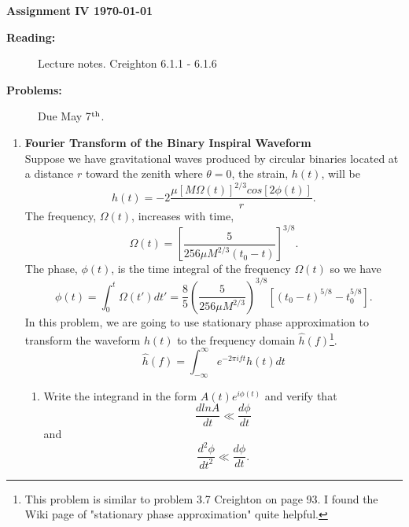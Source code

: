 \documentclass[12pt,twoside]{article}
\begin{document}
%
\centerline{\large\bf  \hfill Assignment IV \hfill  \today}

\medskip
\begin{description}
\item[{\bf Reading:}] Lecture notes. Creighton 6.1.1 - 6.1.6\\
\item[{\bf Problems:} \hfill ] Due May 7$^{\rm th}$.
\end{description}


\medskip

\begin{enumerate}
\item {\bf Fourier Transform of the Binary Inspiral Waveform}\\
Suppose we have gravitational waves produced by circular binaries located at a distance $r$ toward the zenith where $\theta=0$, the strain, $h(t)$, will be
\begin{equation}
    h(t)=-2\frac{\mu \left[M\Omega(t)\right]^{2/3}cos[2\phi(t)]}{r}.
\end{equation}
The frequency, $\Omega(t)$, increases with time,
\begin{equation}
    \Omega(t)=\left[\frac{5}{256\mu M^{2/3}(t_0-t) }\right]^{3/8}.
\end{equation}
The phase, $\phi(t)$, is the time integral of the frequency $\Omega(t)$ so we have
\begin{equation}
    \phi(t)=\int_0^t\Omega(t')dt'=\frac{8}{5}\left(\frac{5}{256\mu M^{2/3}}\right)^{3/8}\left[(t_0-t)^{5/8}-t_0^{5/8}\right].
\end{equation}
In this problem, we are going to use stationary phase approximation to transform the waveform $h(t)$ to the frequency domain $\hat{h}(f)$\footnote{This problem is similar to problem 3.7 Creighton on page 93. I found the Wiki page of "stationary phase approximation" quite helpful.}.
\begin{equation}
\hat{h}(f)=\int_{-\infty}^{\infty}e^{-2\pi ift}h(t)dt    
\end{equation}
\begin{enumerate}
    \item Write the integrand in the form $A(t)e^{i\phi(t)}$ and verify that 
    \begin{equation}
        \frac{d ln A}{dt} \ll \frac{d\phi}{dt} 
    \end{equation}
    and
    \begin{equation}
        \frac{d^2\phi}{dt^2} \ll \frac{d\phi}{dt}.
    \end{equation}

\end{enumerate}
\end{enumerate}
\end{document}
